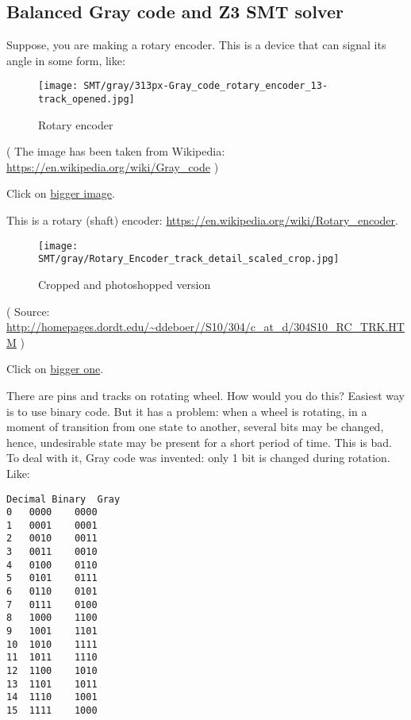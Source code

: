 \subsection{Balanced Gray code and Z3 SMT solver}
\label{Gray_Z3}

Suppose, you are making a rotary encoder.
This is a device that can signal its angle in some form, like:

\begin{figure}[H]
\centering
\texttt{[image: SMT/gray/313px-Gray\_code\_rotary\_encoder\_13-track\_opened.jpg]}
\caption{Rotary encoder}
\end{figure}

( The image has been taken from Wikipedia: \url{https://en.wikipedia.org/wiki/Gray_code} )

Click on \href{https://raw.githubusercontent.com/DennisYurichev/yurichev.com/master/blog/gray/Gray_code_rotary_encoder_13-track_opened.jpg}{bigger image}.

This is a rotary (shaft) encoder: \url{https://en.wikipedia.org/wiki/Rotary_encoder}.

\begin{figure}[H]
\centering
\texttt{[image: SMT/gray/Rotary\_Encoder\_track\_detail\_scaled\_crop.jpg]}
\caption{Cropped and photoshopped version}
\end{figure}

( Source: \url{http://homepages.dordt.edu/~ddeboer//S10/304/c_at_d/304S10_RC_TRK.HTM} )

Click on
\href{https://raw.githubusercontent.com/DennisYurichev/yurichev.com/master/blog/gray/Rotary_Encoder_track_detail.jpg}{bigger one}.

There are pins and tracks on rotating wheel.
How would you do this?
Easiest way is to use binary code.
But it has a problem: when a wheel is rotating, in a moment of transition from one state to another, several bits may be changed, hence, undesirable state may be present for a short period of time.
This is bad.
To deal with it, Gray code was invented: only 1 bit is changed during rotation.
Like:

\begin{lstlisting}
Decimal Binary  Gray
0 	0000 	0000
1 	0001 	0001
2 	0010 	0011
3 	0011 	0010
4 	0100 	0110
5 	0101 	0111
6 	0110 	0101
7 	0111 	0100
8 	1000 	1100
9 	1001 	1101
10 	1010 	1111
11 	1011 	1110
12 	1100 	1010
13 	1101 	1011
14 	1110 	1001
15 	1111 	1000
\end{lstlisting}

